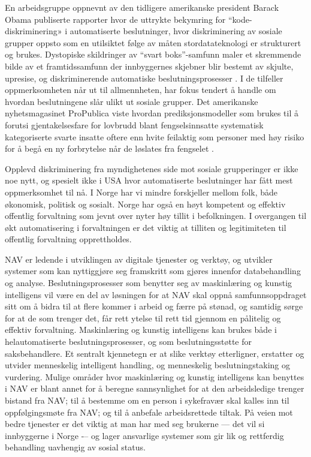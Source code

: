 \documentclass[
  12pt,
  a4paper, 12pt]{article}
\begin{document}
En arbeidsgruppe oppnevnt av den tidligere amerikanske president Barack Obama publiserte rapporter hvor de uttrykte bekymring for ``kode-diskriminering» i automatiserte beslutninger, hvor diskriminering av sosiale grupper oppsto som en utilsiktet følge av måten stordatateknologi er strukturert og brukes.
Dystopiske skildringer av ``svart boks''-samfunn maler et skremmende bilde av et framtidssamfunn der innbyggernes skjebner blir bestemt av skjulte, upresise, og diskriminerende automatiske beslutningsprosesser \citep{barocas2016big, pasquale2015black}.
I de tilfeller oppmerksomheten når ut til allmennheten, har fokus tendert å handle om hvordan beslutningene slår ulikt ut sosiale grupper.
Det amerikanske nyhetsmagasinet ProPublica viste hvordan prediksjonsmodeller som brukes til å forutsi gjentakelsesfare for lovbrudd blant fengselsinnsatte systematisk kategoriserte svarte insatte oftere enn hvite feilaktig som personer med høy risiko for å begå en ny forbrytelse når de løslates fra fengselet \citep{angwin2016machine}.

Opplevd diskriminering fra myndighetenes side mot sosiale grupperinger er ikke noe nytt, og spesielt ikke i USA hvor automatiserte beslutninger har fått mest oppmerksomhet til nå.
I Norge har vi mindre forskjeller mellom folk, både økonomisk, politisk og sosialt.
Norge har også en høyt kompetent og effektiv offentlig forvaltning som jevnt over nyter høy tillit i befolkningen.
I overgangen til økt automatisering i forvaltningen er det viktig at tilliten og legitimiteten til offentlig forvaltning opprettholdes.

NAV er ledende i utviklingen av digitale tjenester og verktøy\citep{hansen2018digitalization}, og utvikler systemer som kan nyttiggjøre seg framskritt som gjøres innenfor databehandling og analyse.
Beslutningsprosesser som benytter seg av maskinlæring og kunstig intelligens vil være en del av løsningen for at NAV skal oppnå samfunnsoppdraget sitt om å bidra til at flere kommer i arbeid og færre på stønad, og samtidig sørge for at de som trenger det, får rett ytelse til rett tid gjennom en pålitelig og effektiv forvaltning.
Maskinlæring og kunstig intelligens kan brukes både i helautomatiserte beslutningsprosesser, og som beslutningsstøtte for saksbehandlere.
Et sentralt kjennetegn er at slike verktøy etterligner, erstatter og utvider menneskelig intelligent handling, og menneskelig beslutningstaking og vurdering.
Mulige områder hvor maskinlæring og kunstig intelligens kan benyttes i NAV er blant annet for å beregne sannsynlighet for at den arbeidsledige trenger bistand fra NAV; til å bestemme om en person i sykefravær skal kalles inn til oppfølgingsmøte fra NAV; og til å anbefale arbeidsrettede tiltak.
På veien mot bedre tjenester er det viktig at man har med seg brukerne --- det vil si innbyggerne i Norge -\/-- og lager ansvarlige systemer som gir lik og rettferdig behandling uavhengig av sosial status.
\end{document}
